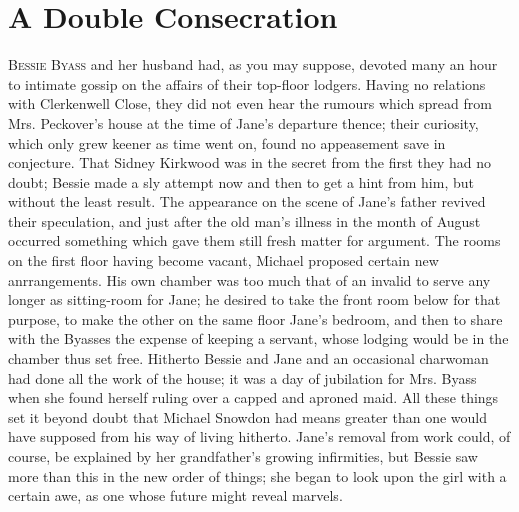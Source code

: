 \chapter{A Double Consecration}

\textsc{Bessie Byass} and her husband had, as you may suppose, devoted
many an hour to intimate gossip on the affairs of their top-floor
lodgers. Having no relations with Clerkenwell Close, they did not even
hear the rumours which spread from Mrs. Peckover's house at the time of
Jane's departure thence; their curiosity, which only grew keener as time
went on, found no appeasement save in conjecture. That Sidney Kirkwood
was in the secret from the first they had no doubt; Bessie made a sly
attempt now and then to get a hint from him, but without the least
result. The appearance on the scene of Jane's father revived their
speculation, and just after the old man's illness in the month of August
occurred something which gave them still fresh matter for {}argument.
The rooms on the first floor having become vacant, Michael proposed
certain new anrrangements. His own chamber was too much that of an
invalid to serve any longer as sitting-room for Jane; he desired to take
the front room below for that purpose, to make the other on the same
floor Jane's bedroom, and then to share with the Byasses the expense of
keeping a servant, whose lodging would be in the chamber thus set free.
Hitherto Bessie and Jane and an occasional charwoman had done all the
work of the house; it was a day of jubilation for Mrs. Byass when she
found herself ruling over a capped and aproned maid. All these things
set it beyond doubt that Michael Snowdon had means greater than one
would have supposed from his way of living hitherto. Jane's removal from
work could, of course, be explained by her grandfather's growing
infirmities, but Bessie saw more than this in the new order of things;
she began to look upon the girl with a certain awe, as one whose future
might reveal marvels.

